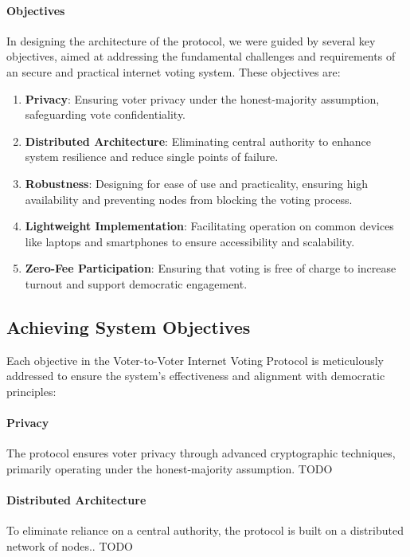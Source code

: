 \documentclass{article}
\begin{document}
\paragraph{Objectives}
In designing the architecture of the protocol, we were guided by several key objectives, aimed at addressing the fundamental challenges and requirements of an secure and practical internet voting system. These objectives are:

\begin{enumerate}
    \item \textbf{Privacy}: Ensuring voter privacy under the honest-majority assumption, safeguarding vote confidentiality.
    \item \textbf{Distributed Architecture}: Eliminating central authority to enhance system resilience and reduce single points of failure.
    \item \textbf{Robustness}: Designing for ease of use and practicality, ensuring high availability and preventing nodes from blocking the voting process.
    \item \textbf{Lightweight Implementation}: Facilitating operation on common devices like laptops and smartphones to ensure accessibility and scalability.
    \item \textbf{Zero-Fee Participation}: Ensuring that voting is free of charge to increase turnout and support democratic engagement.
\end{enumerate}

\subsection{Achieving System Objectives}
Each objective in the Voter-to-Voter Internet Voting Protocol is meticulously addressed to ensure the system's effectiveness and alignment with democratic principles:

\paragraph{Privacy}
The protocol ensures voter privacy through advanced cryptographic techniques, primarily operating under the honest-majority assumption. TODO

\paragraph{Distributed Architecture}
To eliminate reliance on a central authority, the protocol is built on a distributed network of nodes.. TODO
\end{document}
